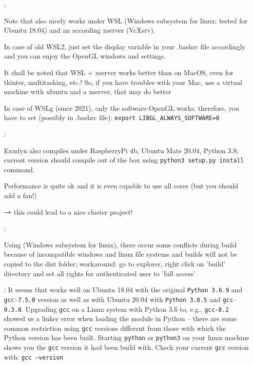 \noindent {}:
\bi
  \item Note that \codeName also nicely works under WSL (Windows subsystem for linux; tested for Ubuntu 18.04) and an according xserver (VcXsrv).
  \item In case of old WSL2, just set the display variable in your .bashrc file accordingly and you can enjoy the OpenGL windows and settings.
  \item It shall be noted that WSL + xserver works better than on MacOS, even for tkinter, multitasking, etc.! So, if you have troubles with your Mac, use a virtual machine with ubuntu and a xserver, that may do better
  \item In case of WSLg (since 2021), only the software-OpenGL works; therefore, you have to set (possibly in .bashrc file): \texttt{export LIBGL\_ALWAYS\_SOFTWARE=0}
\ei

\noindent {}:
\bi
  \item Exudyn also compiles under RaspberryPi 4b, Ubuntu Mate 20.04, Python 3.8; current version should compile out of the box using \texttt{python3 setup.py install} command.
  \item Performance is quite ok and it is even capable to use all cores (but you should add a fan!)
  \item $\rightarrow$ this could lead to a nice cluster project!
\ei

\noindent {}:
\bi
  \item Using  (Windows subsystem for linux), there occur some conflicts during build because of incompatible windows and linux file systems and builds will not be copied to the dist folder; workaround: go to explorer, right click on 'build' directory and set all rights for authenticated user to 'full access'
  \item {}: It seems that \codeName works well on Ubuntu 18.04 with the original \texttt{Python 3.6.9} and \texttt{gcc-7.5.0} version as well as with Ubuntu 20.04 with \texttt{Python 3.8.5} and \texttt{gcc-9.3.0}. Upgrading \texttt{gcc} on a Linux system with Python 3.6 to, e.g., \texttt{gcc-8.2} showed us a linker error when loading the \codeName module in Python -- there are some common restriction using \texttt{gcc} versions different from those with which the Python version has been built. Starting \texttt{python} or \texttt{python3} on your linux machine shows you the \texttt{gcc} version it had been build with. Check your current \texttt{gcc} version with: \texttt{gcc --version}
\ei

